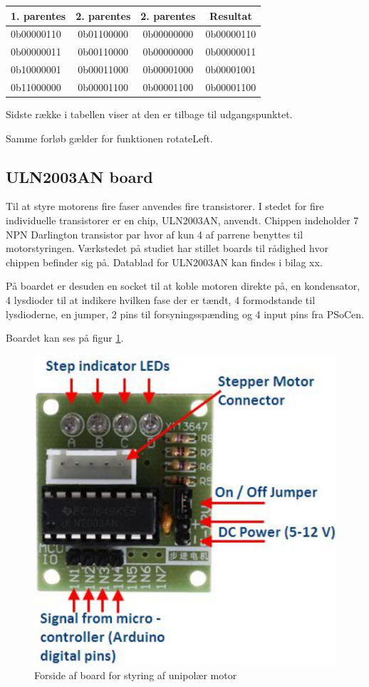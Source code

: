 \begin{table}
\begin{tabular}{| l | c | c | c |}
1. parentes & 2. parentes & 2. parentes \bullet 15 & Resultat\\\hline
0b00000110 & 0b01100000 & 0b00000000 & 0b00000110\\\hline
0b00000011 & 0b00110000 & 0b00000000 & 0b00000011\\\hline
0b10000001 & 0b00011000 & 0b00001000 & 0b00001001\\\hline
0b11000000 & 0b00001100 & 0b00001100 & 0b00001100\\\hline
\end{tabular}
\end{table}

Sidste række i tabellen viser at den er tilbage til udgangspunktet.

Samme forløb gælder for funktionen rotateLeft.

\subsection{ULN2003AN board}
Til at styre motorens fire faser anvendes fire transistorer. I stedet for fire individuelle transistorer er en chip, ULN2003AN, anvendt. Chippen indeholder 7 NPN Darlington transistor par hvor af kun 4 af parrene benyttes til motorstyringen. Værkstedet på studiet har stillet boards til rådighed hvor chippen befinder sig på. Datablad for ULN2003AN kan findes i bilag xx.

På boardet er desuden en socket til at koble motoren direkte på, en kondensator, 4 lysdioder til at indikere hvilken fase der er tændt, 4 formodstande til lysdioderne, en jumper, 2 pins til forsyningsspænding og 4 input pins fra PSoCen.

Boardet kan ses på figur \ref{print_forside}.

\begin{figure}[H]
\includegraphics[scale=0.75]{ULN2003AN_board.png}
\caption{Forside af board for styring af unipolær motor}
\label{print_forside}
\end{figure}

